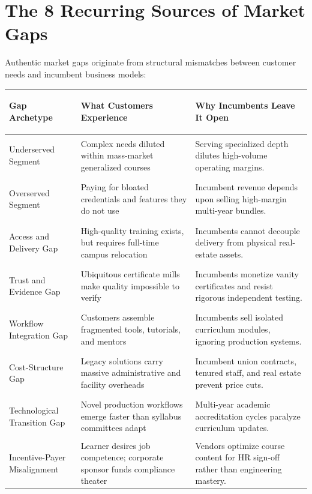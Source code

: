 \section{The 8 Recurring Sources of Market Gaps}

Authentic market gaps originate from structural mismatches between customer needs and incumbent business models:

\begin{tcolorbox}[
  enhanced,
  colback=BayesSurface!60,
  colframe=BayesBorder,
  boxrule=0.5pt,
  arc=3pt,
  left=3pt,right=3pt,top=3pt,bottom=3pt,
  boxsep=1pt
]
\scriptsize
\begin{tabularx}{\linewidth}{>{\bfseries\raggedright\arraybackslash}p{1.9cm} >{\raggedright\arraybackslash}p{2.2cm} X}
\toprule
\textbf{Gap Archetype} & \textbf{What Customers Experience} & \textbf{Why Incumbents Leave It Open} \\
\midrule
Underserved Segment & Complex needs diluted within mass-market generalized courses & Serving specialized depth dilutes high-volume operating margins. \\
\addlinespace[2pt]
Overserved Segment & Paying for bloated credentials and features they do not use & Incumbent revenue depends upon selling high-margin multi-year bundles. \\
\addlinespace[2pt]
Access and Delivery Gap & High-quality training exists, but requires full-time campus relocation & Incumbents cannot decouple delivery from physical real-estate assets. \\
\addlinespace[2pt]
Trust and Evidence Gap & Ubiquitous certificate mills make quality impossible to verify & Incumbents monetize vanity certificates and resist rigorous independent testing. \\
\addlinespace[2pt]
Workflow Integration Gap & Customers assemble fragmented tools, tutorials, and mentors & Incumbents sell isolated curriculum modules, ignoring production systems. \\
\addlinespace[2pt]
Cost-Structure Gap & Legacy solutions carry massive administrative and facility overheads & Incumbent union contracts, tenured staff, and real estate prevent price cuts. \\
\addlinespace[2pt]
Technological Transition Gap & Novel production workflows emerge faster than syllabus committees adapt & Multi-year academic accreditation cycles paralyze curriculum updates. \\
\addlinespace[2pt]
Incentive-Payer Misalignment & Learner desires job competence; corporate sponsor funds compliance theater & Vendors optimize course content for HR sign-off rather than engineering mastery. \\
\bottomrule
\end{tabularx}
\end{tcolorbox}

